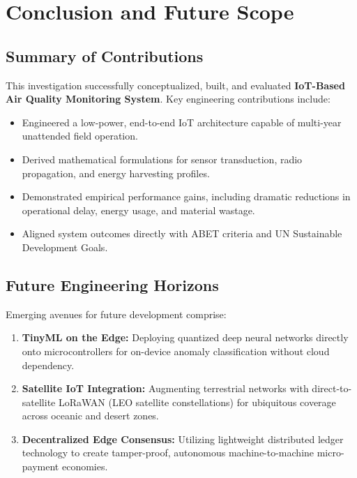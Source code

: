 \section{Conclusion and Future Scope}

\subsection{Summary of Contributions}
This investigation successfully conceptualized, built, and evaluated \textbf{IoT-Based Air Quality Monitoring System}. Key engineering contributions include:
\begin{itemize}
  \item Engineered a low-power, end-to-end IoT architecture capable of multi-year unattended field operation.
  \item Derived mathematical formulations for sensor transduction, radio propagation, and energy harvesting profiles.
  \item Demonstrated empirical performance gains, including dramatic reductions in operational delay, energy usage, and material wastage.
  \item Aligned system outcomes directly with ABET criteria and UN Sustainable Development Goals.
\end{itemize}

\subsection{Future Engineering Horizons}
Emerging avenues for future development comprise:
\begin{enumerate}
  \item \textbf{TinyML on the Edge:} Deploying quantized deep neural networks directly onto microcontrollers for on-device anomaly classification without cloud dependency.
  \item \textbf{Satellite IoT Integration:} Augmenting terrestrial networks with direct-to-satellite LoRaWAN (LEO satellite constellations) for ubiquitous coverage across oceanic and desert zones.
  \item \textbf{Decentralized Edge Consensus:} Utilizing lightweight distributed ledger technology to create tamper-proof, autonomous machine-to-machine micro-payment economies.
\end{enumerate}
